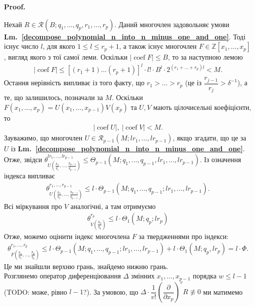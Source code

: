 \documentclass[a4paper, 10pt]{article}
\makeatletter
\theoremstyle{theoremdd}
\theoremstyle{theoremdd}
\theoremstyle{theoremdd}
\theoremstyle{theoremdd}
\theoremstyle{theoremdd}
\theoremstyle{theoremdd}
\theoremstyle{theoremdd}
\theoremstyle{theoremdd}
\theoremstyle{theoremdd}
\theoremstyle{theoremdd}
\theoremstyle{theoremdd}
\theoremstyle{theoremdd}
\theoremstyle{theoremdd}
\theoremstyle{theoremdd}
\theoremstyle{theoremdd}
\renewenvironment{proof}[1][Proof.\\]{\par
\pushQED{\hfill \qed}%
\normalfont \topsep6\p@\@plus6\p@\relax
\trivlist
\item\relax
{\bfseries
#1\@addpunct{.}}\hspace\labelsep\ignorespaces
}{%
\popQED\endtrivlist\@endpefalse
}
\DeclareMathOperator{\coef}{coef}
\newcommand\lmref[1]{\textbf{Lm.~\ref{#1}}}
\makeatother
\begin{document}
\begin{proof}
Нехай $R \in \mathcal{R}(B;q_1,\dots,q_p,r_1,\dots,r_p)$. Даний многочлен задовольняє умови \lmref{decompose_polynomial_n_into_n_minus_one_and_one}. Тоді існує число $l$, для якого $1 \leq l \leq r_p+1$, а також існує многочлен $F \in \mathbb{Z}[x_1,\dots,x_p]$, вигляд якого з тої самої леми. Оскільки $|\coef F| \leq B$, то за наступною лемою
\begin{align*}
|\coef F| \leq [(r_1+1) \dots (r_p+1)]^l \cdot l! \cdot B^l \cdot 2^{(r_1+\dots+r_p)l} < M.
\end{align*}
Остання нерівність випливає із того факту, що $r_1 > \dots > r_p$ (це із $\dfrac{r_{j-1}}{r_j} > \delta^{-1}$), а те, що залишилось, позначали за $M$. Оскільки $F(x_1,\dots,x_p) = U(x_1,\dots,x_{p-1})V(x_p)$ та $U,V$ мають цілочисельні коефіцієнти, то
\begin{align*}
| \coef U|,\ |\coef V| < M.
\end{align*}
Зауважимо, що многочлен $U \in \mathcal{R}_{p-1}(M;lr_1,\dots,lr_{p-1})$, якщо згадати, що це за $U$ із \lmref{decompose_polynomial_n_into_n_minus_one_and_one}. Отже, звідси $\theta_{U\left( \frac{h_1}{q_1},\dots,\frac{h_{p-1}}{q_{p-1}} \right)}^{lr_1,\dots,lr_{p-1}} \leq \Theta_{p-1}(M;q_1,\dots,q_{p-1},lr_1,\dots,lr_{p-1})$. Із означення індекса випливає
\begin{align*}
\theta_{U\left( \frac{h_1}{q_1},\dots,\frac{h_{p-1}}{q_{p-1}} \right)}^{r_1,\dots,r_{p-1}} \leq l \cdot \Theta_{p-1}(M;q_1,\dots,q_{p-1};lr_1,\dots,lr_{p-1}).
\end{align*}
Всі міркування про $V$ аналогічні, а там отримуємо
\begin{align*}
\theta_{V\left( \frac{h_p}{q_p} \right)}^{r_p} \leq l \cdot \Theta_1(M;q_p;lr_p)
\end{align*}
Отже, можемо оцінити індекс многочлена $F$ за твердженнями про індекси:
\begin{align*}
\theta_{F\left( \frac{h_1}{q_1},\dots,\frac{h_p}{q_p} \right)}^{r_1,\dots,r_p} \leq l \cdot \Theta_{p-1}(M;q_1,\dots,q_{p-1};lr_1,\dots,lr_{p-1}) + l \cdot \Theta_1(M;q_p, lr_p) = l \cdot \Phi.
\end{align*}
Це ми знайшли верхню грань, знайдемо нижню грань.
\bigskip \\
Розглянемо оператор диференціювання $\Delta$ змінних $x_1,\dots,x_{p-1}$ порядка $w \leq l-1$ (TODO: може, рівно $l-1$?). За умовою, що $\Delta \cdot \dfrac{1}{v!} \left( \dfrac{\partial}{\partial x_p} \right)^v R \not\equiv 0$ ми матимемо
\begin{align*}

\end{align*}
\end{proof}
\end{document}
